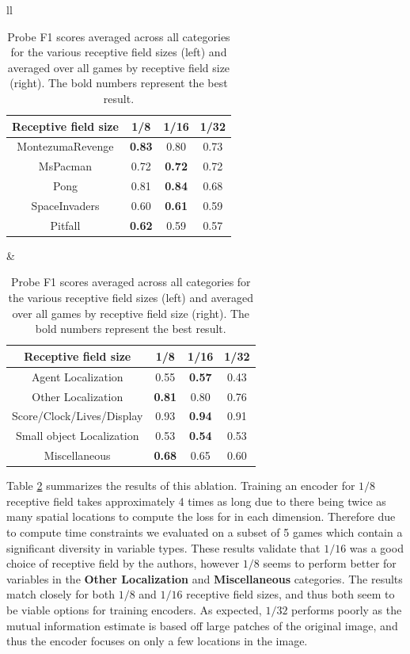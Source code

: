 \documentclass{article}
\begin{document}
\begin{table}[H]
\centering
\begin{tabular}{ll}
    \begin{tabular}{c|ccc}
         \toprule Receptive field size & 1/8 & 1/16 & 1/32 \\
         \hline MontezumaRevenge & \textbf{0.83} & 0.80 & 0.73  \\
         MsPacman & 0.72 & \textbf{0.72} & 0.72 \\
         Pong & 0.81 & \textbf{0.84} & 0.68 \\
         SpaceInvaders & 0.60 & \textbf{0.61} & 0.59 \\
         Pitfall & \textbf{0.62} & 0.59 & 0.57 \\\bottomrule
    \end{tabular}
&

    \begin{tabular}{c|ccc}
        \toprule Receptive field size & 1/8 & 1/16 & 1/32 \\
        \hline Agent Localization & 0.55 & \textbf{0.57} & 0.43 \\
        Other Localization & \textbf{0.81} & 0.80 & 0.76 \\
        Score/Clock/Lives/Display & 0.93 & \textbf{0.94} & 0.91 \\
        Small object Localization & 0.53 & \textbf{0.54} & 0.53 \\
        Miscellaneous & \textbf{0.68} & 0.65 & 0.60 \\\bottomrule
    \end{tabular}
\end{tabular}
\caption{Probe F1 scores averaged across all categories for the various receptive field sizes (left) and averaged over all games by receptive field size (right). The bold numbers represent the best result.}
\label{tab:receptive-field-results}
\end{table}

Table \ref{tab:receptive-field-results} summarizes the results of this ablation. Training an encoder for $1/8$ receptive field takes approximately 4 times as long due to there being twice as many spatial locations to compute the loss for in each dimension. Therefore due to compute time constraints we evaluated on a subset of 5 games which contain a significant diversity in variable types. These results validate that $1/16$ was a good choice of receptive field by the authors, however $1/8$ seems to perform better for variables in the \textbf{Other Localization} and \textbf{Miscellaneous} categories. The results match closely for both $1/8$ and $1/16$ receptive field sizes, and thus both seem to be viable options for training encoders. As expected, $1/ 32$ performs poorly as the mutual information estimate is based off large patches of the original image, and thus the encoder focuses on only a few locations in the image. \\
\end{document}
